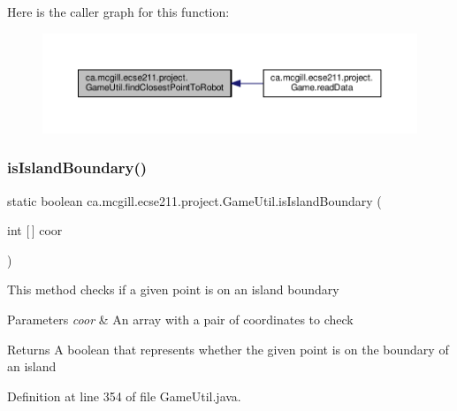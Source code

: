Here is the caller graph for this function\+:\nopagebreak
\begin{figure}[H]
\begin{center}
\leavevmode
\includegraphics[width=350pt]{classca_1_1mcgill_1_1ecse211_1_1project_1_1_game_util_a6e0ee94b800ca3727ca8009782abda14_icgraph}
\end{center}
\end{figure}
\mbox{\label{classca_1_1mcgill_1_1ecse211_1_1project_1_1_game_util_a5783c3415e13b66362a647504b63741a}} 
\subsubsection{\texorpdfstring{is\+Island\+Boundary()}{isIslandBoundary()}}
{\footnotesize\ttfamily static boolean ca.\+mcgill.\+ecse211.\+project.\+Game\+Util.\+is\+Island\+Boundary (\begin{DoxyParamCaption}\item[{int \mbox{[}$\,$\mbox{]}}]{coor }\end{DoxyParamCaption})\hspace{0.3cm}{\ttfamily [static]}}

This method checks if a given point is on an island boundary


\begin{DoxyParams}{Parameters}
{\em coor} & An array with a pair of coordinates to check \\
\hline
\end{DoxyParams}
\begin{DoxyReturn}{Returns}
A boolean that represents whether the given point is on the boundary of an island 
\end{DoxyReturn}


Definition at line 354 of file Game\+Util.\+java.


